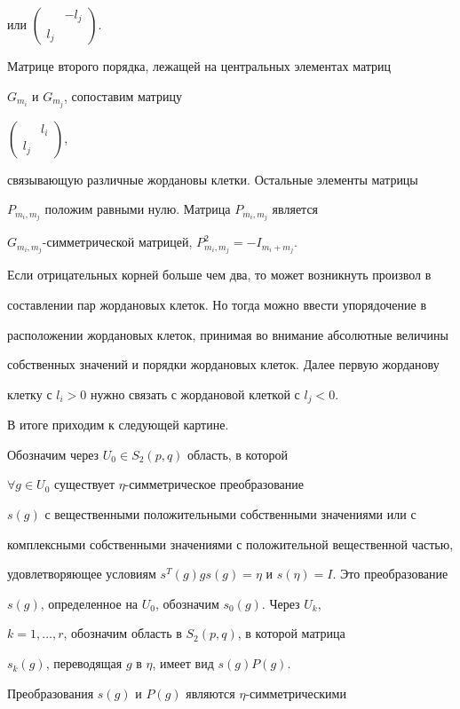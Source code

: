 или $\left(\begin{smallmatrix}&-l_j\\l_j&\end{smallmatrix}\right)$.


Матрице второго порядка, лежащей на центральных элементах матриц


$G_{m_i}$ и $G_{m_j}$, сопоставим матрицу


$\left(\begin{smallmatrix}&l_i\\l_j&\end{smallmatrix}\right)$,


связывающую различные жордановы клетки. Остальные элементы матрицы


$P_{m_i,m_j}$ положим равными нулю. Матрица $P_{m_i,m_j}$ является


$G_{m_i,m_j}$-симметрической матрицей, $P_{m_i,m_j}^2=-I_{m_i+m_j}$.


Если отрицательных корней больше чем два, то может возникнуть произвол в 


составлении пар жордановых клеток. Но тогда можно ввести упорядочение в 


расположении жордановых клеток, принимая во внимание абсолютные величины 


собственных значений и порядки жордановых клеток. Далее первую жорданову 


клетку с $l_i>0$ нужно связать с жордановой клеткой с $l_j<0$.


В итоге приходим к следующей картине.





Обозначим через $U_0\in S_2(p,q)$ область, в которой


$\forall g\in U_0$ существует $\eta$-симметрическое преобразование


$s(g)$ с вещественными положительными собственными значениями или с 


комплексными собственными значениями с положительной вещественной частью, 


удовлетворяющее условиям $s^T(g)gs(g)=\eta$ и $s(\eta)=I$. Это преобразование


$s(g)$, определенное на $U_0$, обозначим $s_0(g)$. Через $U_k$,


$k=1,\dotsc,r$, обозначим область в $S_2(p,q)$, в которой матрица


$s_k(g)$, переводящая $g$ в $\eta$, имеет вид $s(g)P(g)$.


Преобразования $s(g)$ и $P(g)$ являются $\eta$-симметрическими


